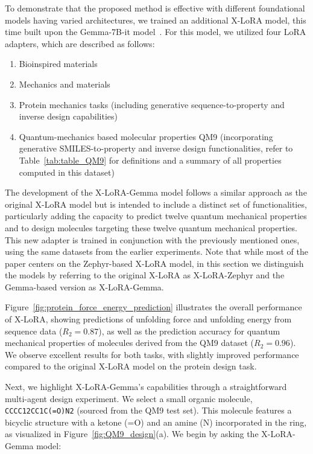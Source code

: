 To demonstrate that the proposed method is effective with different foundational models having varied architectures, we trained an additional X-LoRA model, this time built upon the Gemma-7B-it model~\cite{Google/gemma-7b-itFace}. For this model, we utilized four LoRA adapters, which are described as follows:

\begin{enumerate}
    \item Bioinspired materials \item Mechanics and materials \item Protein mechanics tasks (including generative sequence-to-property and inverse design capabilities) \item Quantum-mechanics based molecular properties QM9 (incorporating generative SMILES-to-property and inverse design functionalities, refer to Table~\ref{tab:table_QM9} for definitions and a summary of all properties computed in this dataset)~\cite{Ruddigkeit2012EnumerationGDB-17,Ramakrishnan2015ElectronicSpace}
\end{enumerate}

The development of the X-LoRA-Gemma model follows a similar approach as the original X-LoRA model but is intended to include a distinct set of functionalities, particularly adding the capacity to predict twelve quantum mechanical properties and to design molecules targeting these twelve quantum mechanical properties. This new adapter is trained in conjunction with the previously mentioned ones, using the same datasets from the earlier experiments. Note that while most of the paper centers on the Zephyr-based X-LoRA model, in this section we distinguish the models by referring to the original X-LoRA as X-LoRA-Zephyr and the Gemma-based version as X-LoRA-Gemma.

Figure~\ref{fig:protein_force_energy_prediction} illustrates the overall performance of X-LoRA, showing predictions of unfolding force and unfolding energy from sequence data ($R_2 = 0.87$), as well as the prediction accuracy for quantum mechanical properties of molecules derived from the QM9 dataset ($R_2 = 0.96$). We observe excellent results for both tasks, with slightly improved performance compared to the original X-LoRA model on the protein design task.

Next, we highlight X-LoRA-Gemma’s capabilities through a straightforward multi-agent design experiment. We select a small organic molecule, \texttt{CCCC12CC1C(=O)N2} (sourced from the QM9 test set). This molecule features a bicyclic structure with a ketone (=O) and an amine (N) incorporated in the ring, as visualized in Figure~\ref{fig:QM9_design}(a). We begin by asking the X-LoRA-Gemma model:


